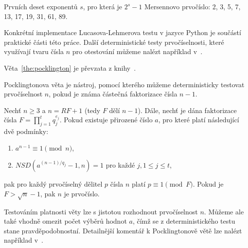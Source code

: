 \documentclass[
  program=infoi,
  biblatex=false,
  figures=true,
  glossaries,
  tables=false,
  sourcecodes=true,
  index
]{kidiplom}
\begin{document}
            \begin{remark}\label{rem:mersenne-nums-example}
                Prvních deset exponentů $s$, pro která je $2^s-1$ Mersennovo prvočíslo: 2, 3, 5, 7, 13, 17, 19, 31, 61, 89.
            \end{remark}

            Konkrétní implementace Lucasova-Lehmerova testu v jazyce Python je součástí praktické části této práce.
            Další deterministické testy prvočíselnosti, které využívají tvaru čísla $n$ pro otestování
            můžeme nalézt například v~\cite{primes-and-factorization}.
            


            Věta~\ref{the:pocklington} je převzata z knihy~\cite{handbook}.

            Pocklingtonova věta je nástroj, pomocí kterého můžeme deterministicky testovat prvočíselnost $n$, pokud je
            známa částečná faktorizace čísla $n-1$.

            \begin{theorem}\label{the:pocklington}
                Nechť $n \geq 3$ a $n = RF + 1$ (tedy $F$ dělí $n-1$).
                Dále, nechť je dána faktorizace čísla $F = \prod_{j=1}^t{q_j^{e_j}}$.
                Pokud existuje přirozené číslo $a$, pro které platí následující dvě podmínky:

                \begin{enumerate}[label=(\roman*)]
                    \item 
                        $a^{n-1} \equiv 1 \pmod{n}$,
                    \item
                        $NSD(a^{(n-1)/q_j} - 1, n) = 1$ pro každé $j, 1 \leq j \leq t$,
                \end{enumerate}

                \noindent
                pak pro každý prvočíselný dělitel $p$ čísla $n$ platí $p \equiv 1 \pmod{F}$.
                Pokud je $F > \sqrt{n} - 1$, pak $n$ je prvočíslo.
            \end{theorem}

            Testováním platnosti věty lze s jistotou rozhodnout prvočíselnost $n$.
            Můžeme ale také vhodně omezit počet výběrů hodnot $a$, čímž se z deterministického testu stane pravděpodobnostní.
            Detailnější komentář k Pocklingtonově větě lze nalézt například v~\cite{rsa-and-public}.
\end{document}
